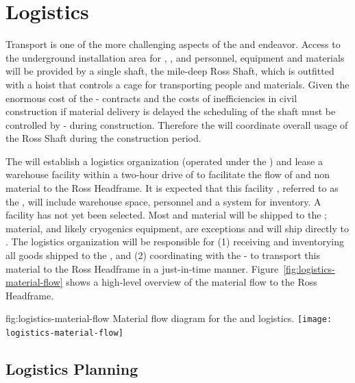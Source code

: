 \section{Logistics}
\label{sec:fdsp-tc-log}


Transport is one of the more challenging aspects of the  and  endeavor.  
Access to the underground installation area for , , and  personnel, equipment and materials will be provided by a single shaft, the mile-deep Ross Shaft, which is outfitted with a hoist that controls a cage for transporting people and materials.  
Given the enormous cost of the - contracts and the costs of inefficiencies in civil construction if material delivery is delayed the scheduling of the shaft must be controlled by - during construction. Therefore the    will coordinate overall usage of the Ross Shaft during the construction period.

The   will establish a logistics organization (operated under the  ) and lease a warehouse facility within a two-hour drive of   to facilitate the flow of  and  non material to the Ross Headframe.  It is expected that this facility , referred to as the , will include warehouse space, personnel and a  system for inventory.  
A facility has not yet been selected. 
Most  and  material will be shipped to the ;  material, and likely cryogenics equipment, are exceptions and will ship directly to . 
The logistics  organization will be responsible for (1) receiving and inventorying all  goods shipped to the , and (2) coordinating with the -  to transport this material to the Ross Headframe in a just-in-time manner. 
Figure~\ref{fig:logistics-material-flow} shows a high-level overview of the material flow to the Ross Headframe.


 
\begin{dunefigure}{fig:logistics-material-flow}
  {Material flow diagram for the  and  logistics.}
 \texttt{[image: logistics-material-flow]}
\end{dunefigure}

\subsection{Logistics Planning}
\label{sec:fdsp-tc-logPln}

